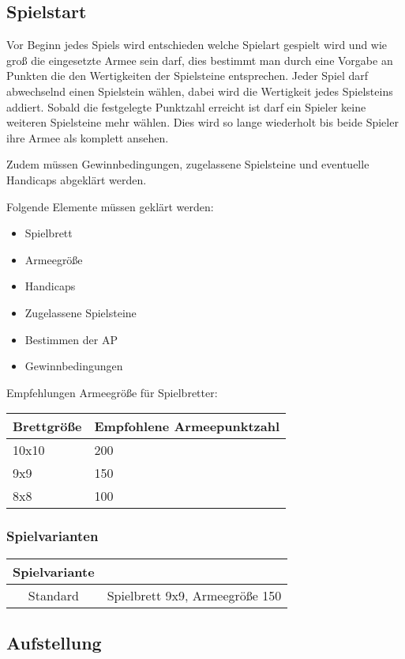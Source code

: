 \documentclass{article}
\begin{document}
\subsection{Spielstart}
	Vor Beginn jedes Spiels wird entschieden welche Spielart gespielt wird und wie groß die eingesetzte Armee sein darf,
	dies bestimmt man durch eine Vorgabe an Punkten die den Wertigkeiten der Spielsteine entsprechen.
	Jeder Spiel darf abwechselnd einen Spielstein wählen, dabei wird die Wertigkeit jedes Spielsteins addiert.
	Sobald die festgelegte Punktzahl erreicht ist darf ein Spieler keine weiteren Spielsteine mehr wählen.
	Dies wird so lange wiederholt bis beide Spieler ihre Armee als komplett ansehen.

	Zudem müssen Gewinnbedingungen, zugelassene Spielsteine und eventuelle Handicaps abgeklärt werden. 

	Folgende Elemente müssen geklärt werden:
	\begin{itemize}
	\item Spielbrett 
	\item Armeegröße 
	\item Handicaps 
	\item Zugelassene Spielsteine 
	\item Bestimmen der AP
	\item Gewinnbedingungen
	\end{itemize}
	
	Empfehlungen Armeegröße für Spielbretter:
	
	\begin{tabular}{ll}
	\hline
	Brettgröße & Empfohlene Armeepunktzahl \\ \hline
	10x10 & 200 \\
	9x9 & 150 \\
	8x8 & 100 \\ 
	\end{tabular} 
	
	\subsubsection{Spielvarianten}
	\begin{tabular}{cc}
    \hline 
    Spielvariante &  \\ 
    \hline 
    Standard & Spielbrett 9x9, Armeegröße 150
    \\ 
	\hline 
	\end{tabular} 
	

\subsection{Aufstellung}
\end{document}
